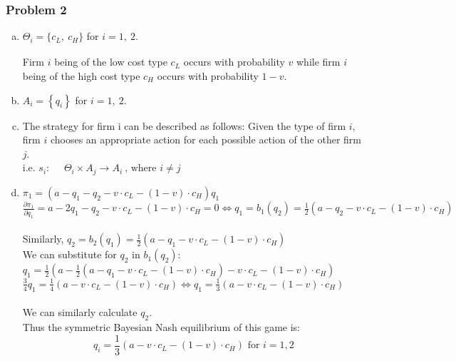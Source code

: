 \documentclass[a4paper]{article}
\begin{document}
\subsubsection{Problem 2}
\begin{enumerate}[(a)]
\item
\textsubscript{­}­\(\Theta_{i} = \{ c_{L},\ c_{H}\}\) for
\(i = 1,\ 2\).

Firm \(i\) being of the low cost type \(c_{L}\) occurs with probability
\(v\) while firm \(i\) being of the high cost type \(c_{H}\) occurs with
probability \(1 - v\).


\item \(A_{i} = \left\{ q_{i} \right\}\) for \(i = 1,\ 2\).

\item The strategy for firm\(\text{\ i}\) can be described as follows:
Given the type of firm $i$, firm $i$ chooses an appropriate action for each possible action of the other firm $j$.\\
i.e. \(s_{i}:\ \ \ \ \ \ \Theta_{i} \times A_{j} \rightarrow A_{i}\ \text{, where }i\ne j \)
\item
$\pi_1=\left(a-q_1-q_2-v\cdot c_L- (1-v)\cdot c_H\right)q_1$\\
$\frac{\partial\pi_1}{\partial q_1}=a-2q_1-q_2-v\cdot c_L-(1-v)\cdot c_H=0 \iff q_1=b_1(q_2)=\frac{1}{2}(a-q_2-v\cdot c_L-(1-v)\cdot c_H)$\\ \\
Similarly, $q_2=b_2(q_1)=\frac{1}{2}(a-q_1-v\cdot c_L-(1-v)\cdot c_H)$
\\
We can substitute for $q_2$ in $b_1(q_2)$:
\\
$q_1=\frac{1}{2}(a-\frac{1}{2}(a-q_1-v\cdot c_L-(1-v)\cdot c_H)-v\cdot c_L-(1-v)\cdot c_H)$\\
$\frac{3}{4}q_1=\frac{1}{4}(a-v\cdot c_L-(1-v)\cdot c_H)\iff q_1=\frac{1}{3}(a-v\cdot c_L-(1-v)\cdot c_H)$\\
\\ We can similarly calculate $q_2$.
\\
Thus the symmetric Bayesian Nash equilibrium of this game is:
$$q_i=\frac{1}{3}(a-v\cdot c_L-(1-v)\cdot c_H) \text{ for } i=1,2$$
\end{enumerate}
\end{document}

